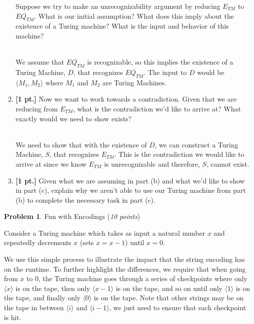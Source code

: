 \documentclass[11pt]{article}
\theoremstyle{definition}
\theoremstyle{theorem}
\newtheorem{prob}{Problem}
\newcommand{\solution}{\medskip\noindent{\color{blue}\textbf{Solution:}}}
\begin{document}
\begin{enumerate}[label=(\alph*)]
Suppose we try to make an unrecognizability argument by reducing $E_{TM}$ to $\overline{EQ_{TM}}$.
What is our initial assumption? What does this imply about the existence of a Turing machine? What is the input and behavior of this machine?

\solution \\
We assume that $\overline{EQ_{TM}}$ is recognizable, so this implies the existence of a Turing Machine, $D$, that recognizes $\overline{EQ_{TM}}$. The input to $D$ would be $\langle M_1, M_2 \rangle$ where $M_1$ and $M_2$ are Turing Machines.


\item \textbf{[1 pt.]} Now we want to work towards a contradiction. Given that we are reducing from $E_{TM}$, what is the contradiction we'd like to arrive at? What exactly would we need to show exists?

\solution \\
We need to show that with the existence of $D$, we can construct a Turing Machine, $S$, that recognizes $E_{TM}$. This is the contradiction we would like to arrive at since we know $E_{TM}$ is unrecognizable and therefore, $S$, cannot exist. 



\item \textbf{[1 pt.]} Given what we are assuming in part (b) and what we'd like to show in part (c), explain why we aren't able to use our Turing machine from part (b) to complete the necessary task in part (c). 

\solution





\end{enumerate}

\newpage

\begin{prob} Fun with Encodings (\emph{10 points})\end{prob}

Consider a Turing machine which takes as input a natural number $x$ and repeatedly decrements $x$ (sets $x=x-1$) until $x=0$. 

We use this simple process to illustrate the impact that the string encoding has on the runtime. To further highlight the differences, we require that when going from $x$ to $0$, the Turing machine goes through a series of checkpoints where only $\langle x \rangle$ is on the tape, then only $\langle x-1 \rangle$ is on the tape, and so on until only $\langle 1 \rangle$ is on the tape, and finally only $\langle 0 \rangle$ is on the tape. Note that other strings may be on the tape in between $\langle i \rangle$ and $\langle i-1 \rangle$, we just need to ensure that each checkpoint is hit.
\end{document}
